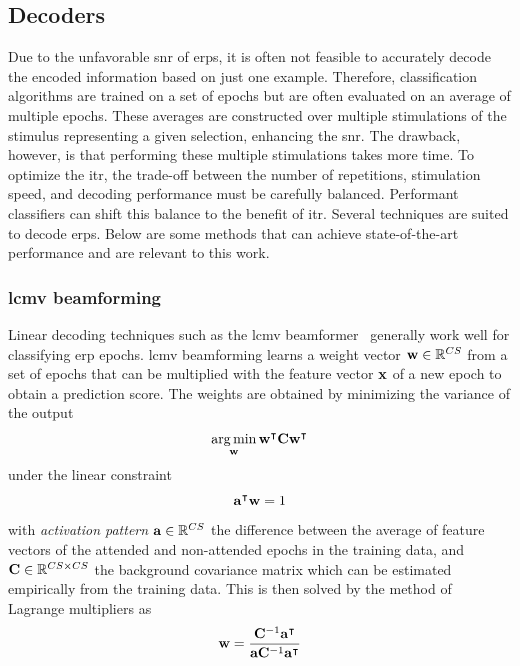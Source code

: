 \subsection{Decoders}

Due to the unfavorable \ac{snr} of \acp{erp}, it is often not feasible to accurately
decode the encoded information based on just one example.
Therefore, classification algorithms are trained on a set of epochs but are often
evaluated on an average of multiple epochs.
These averages are constructed over multiple stimulations of the stimulus representing
a given selection, enhancing the \ac{snr}.
The drawback, however, is that performing these multiple stimulations takes more time.
To optimize the \ac{itr}, the trade-off between the number of repetitions, stimulation
speed, and decoding performance must be carefully balanced.
Performant classifiers can shift this balance to the benefit of \ac{itr}.
Several techniques are suited to decode \acp{erp}.
Below are some methods that can achieve state-of-the-art performance and are relevant to
this work.

\subsubsection{\Acf{lcmv} beamforming}

Linear decoding techniques such as the \ac{lcmv} beamformer~\cite{Wittevrongel2016}
generally work well for classifying \ac{erp} epochs.
\Ac{lcmv} beamforming learns a weight vector $\mathbf{w}\in\mathbb{R}^{CS}$ from
a set of epochs that can be multiplied with the feature vector $\mathbf{x}$ of a
new epoch to obtain a prediction score.
The weights are obtained by minimizing the variance of the output
\begin{equation}
  \operatorname*{arg\,min}_{\mathbf{w}}\mathbf{w}^\intercal\mathbf{C}
	\mathbf{w}^\intercal
\end{equation}
under the linear constraint
\begin{equation}
	\mathbf{a}^\intercal\mathbf{w} = 1
\end{equation}
with \emph{activation pattern} $\mathbf{a}\in\mathbb{R}^{CS}$ the difference between the
average of feature vectors of the attended and non-attended epochs in the
training data,
and $\mathbf{C}\in\mathbb{R}^{CS\times CS}$ the background covariance matrix which
can be estimated empirically from the training data.
This is then solved by the method of Lagrange multipliers as
\begin{equation}
	\mathbf{w} =
  \frac{\mathbf{C}^{-1}\mathbf{a}^\intercal}
  {\mathbf{a}\mathbf{C}^{-1}\mathbf{a}^\intercal}
\end{equation}

